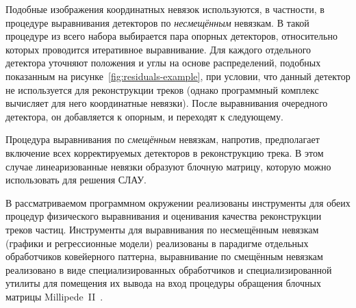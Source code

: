 Подобные изображения координатных невязок используются, в частности,
в процедуре выравнивания детекторов по \emph{несмещённым} невязкам.
В такой процедуре из всего набора выбирается пара опорных детекторов,
относительно которых проводится итеративное выравнивание.
Для каждого отдельного детектора уточняют положения и углы на основе распределений,
подобных показанным на рисунке~\ref{fig:residuals-example}, при условии,
что данный детектор не используется для реконструкции треков (однако
программный комплекс вычисляет для него координатные невязки). После
выравнивания очередного детектора, он добавляется к опорным, и переходят
к следующему.

Процедура выравнивания по \emph{смещённым} невязкам, напротив,
предполагает включение всех корректируемых детекторов в реконструкцию трека.
В этом случае линеаризованные невязки образуют блочную матрицу,
которую можно использовать для решения СЛАУ.

В рассматриваемом программном окружении реализованы инструменты
для обеих процедур физического выравнивания и оценивания качества
реконструкции треков частиц. Инструменты для выравнивания по
несмещённым невязкам (графики и регрессионные модели) реализованы
в парадигме отдельных обработчиков ковейерного паттерна, выравнивание
по смещённым невязкам реализовано в виде специализированных
обработчиков и специализированной утилиты для помещения их вывода
на вход процедуры обращения блочных матрицы
Millipede~II~\cite{millipede-blobel2009}.
